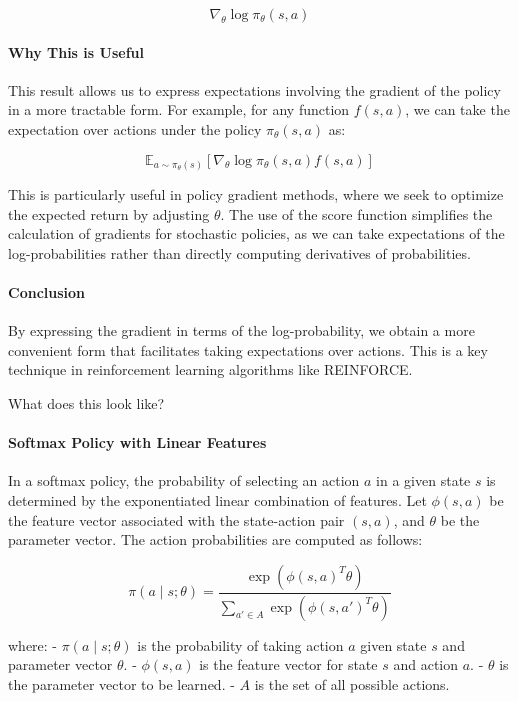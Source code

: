 \documentclass[10pt, oneside]{article}
\theoremstyle{definition}
\begin{document}
\[
\nabla_\theta \log \pi_\theta(s, a)
\]

\paragraph{Why This is Useful}

This result allows us to express expectations involving the gradient of the policy in a more tractable form. For example, for any function $f(s, a)$, we can take the expectation over actions under the policy $\pi_\theta(s, a)$ as:

\[
\mathbb{E}_{a \sim \pi_\theta(s)} \left[ \nabla_\theta \log \pi_\theta(s, a) f(s, a) \right]
\]

This is particularly useful in policy gradient methods, where we seek to optimize the expected return by adjusting $\theta$. The use of the score function simplifies the calculation of gradients for stochastic policies, as we can take expectations of the log-probabilities rather than directly computing derivatives of probabilities.

\paragraph{Conclusion}

By expressing the gradient in terms of the log-probability, we obtain a more convenient form that facilitates taking expectations over actions. This is a key technique in reinforcement learning algorithms like REINFORCE.



What does this look like?

\paragraph{Softmax Policy with Linear Features}

In a softmax policy, the probability of selecting an action $a$ in a given state $s$ is determined by the exponentiated linear combination of features. Let $\phi(s, a)$ be the feature vector associated with the state-action pair $(s, a)$, and $\theta$ be the parameter vector. The action probabilities are computed as follows:

\[
\pi(a \mid s; \theta) = \frac{\exp(\phi(s, a)^T \theta)}{\sum_{a' \in A} \exp(\phi(s, a')^T \theta)}
\]

where:
- $\pi(a \mid s; \theta)$ is the probability of taking action $a$ given state $s$ and parameter vector $\theta$.
- $\phi(s, a)$ is the feature vector for state $s$ and action $a$.
- $\theta$ is the parameter vector to be learned.
- $A$ is the set of all possible actions.
\end{document}
